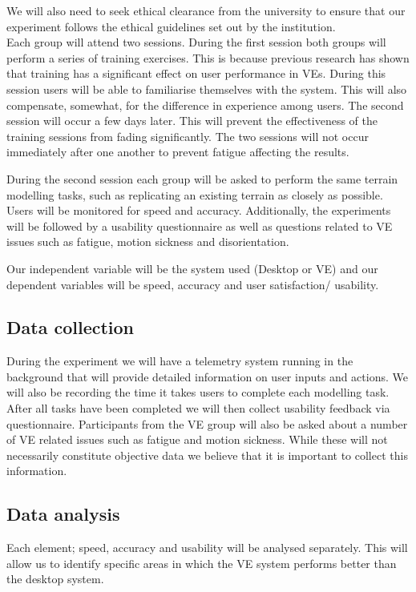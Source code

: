 \documentclass{sig-alternate-05-2015}
\begin{document}
We will also need to seek ethical clearance from the university to ensure that our experiment follows the ethical guidelines set out by the institution.\\

Each group will attend two sessions. During the first session both groups will perform a series of training exercises. This is because  previous research has shown that training has a significant effect on user performance in VEs\cite{Schultheis2012}. During this session users will be able to familiarise themselves with the system. This will also compensate, somewhat, for the difference in experience among users. The second session will occur a few days later. This will prevent the effectiveness of the training sessions from fading significantly. The two sessions will not occur immediately after one another to prevent fatigue affecting the results.

During the second session each group will be asked to perform the same terrain modelling tasks, such as replicating an existing terrain as closely as possible. Users will be monitored for speed and accuracy. Additionally, the experiments will be followed by a usability questionnaire as well as questions related to VE issues such as fatigue, motion sickness and disorientation.

Our independent variable will be the system used (Desktop or VE) and our dependent variables will be speed, accuracy and user satisfaction/ usability.

\subsection{Data collection}
During the experiment we will have a telemetry system running in the background that will provide detailed information on user inputs and actions. We will also be recording the time it takes users to complete each modelling task. After all tasks have been completed we will then collect usability feedback via questionnaire. Participants from the VE group will also be asked about a number of VE related issues such as fatigue and motion sickness. While these will not necessarily constitute objective data we believe that it is important to collect this information.
\subsection{Data analysis}
Each element; speed, accuracy and usability will be analysed separately. This will allow us to identify specific areas in which the VE system performs better than the desktop system.
\end{document}

